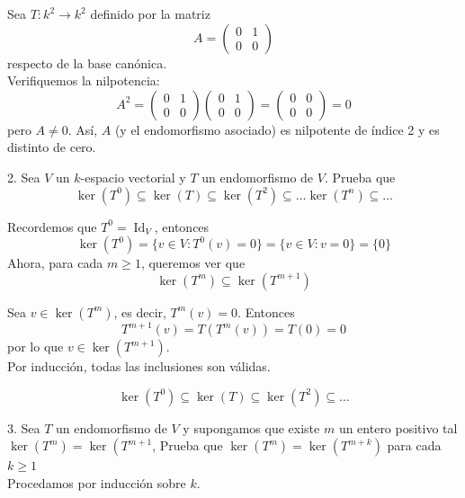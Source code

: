 \documentclass{article}
\theoremstyle{nonumberplain}
\begin{document}
Sea \( T: k^2 \to k^2 \) definido por la matriz
\[
A = \begin{pmatrix}
0 & 1 \\
0 & 0
\end{pmatrix}
\]
respecto de la base canónica. \\

Verifiquemos la nilpotencia:
\[
A^2 = \begin{pmatrix}
0 & 1 \\
0 & 0
\end{pmatrix}
\begin{pmatrix}
0 & 1 \\
0 & 0
\end{pmatrix}
=
\begin{pmatrix}
0 & 0 \\
0 & 0
\end{pmatrix} = 0
\]
pero \( A \neq 0 \). Así, \( A \) (y el endomorfismo asociado) es nilpotente de índice 2 y es distinto de cero.

2. Sea \( V \) un \( k \)-espacio vectorial y \( T \) un endomorfismo de \( V \). Prueba que
\[
\operatorname{ker}\left(T^{0}\right) \subseteq \operatorname{ker}(T) \subseteq \operatorname{ker}\left(T^{2}\right) \subseteq \ldots \operatorname{ker}\left(T^{n}\right) \subseteq \ldots
\]

Recordemos que \( T^0 = \operatorname{Id}_V \), entonces
\[
\operatorname{ker}(T^0) = \{v \in V : T^0(v) = 0\} = \{v \in V : v = 0\} = \{0\}
\]
Ahora, para cada \( m \geq 1 \), queremos ver que
\[
\operatorname{ker}(T^{m}) \subseteq \operatorname{ker}(T^{m+1})
\]

Sea \( v \in \operatorname{ker}(T^{m}) \), es decir, \( T^{m}(v) = 0 \). Entonces
\[
T^{m+1}(v) = T(T^{m}(v)) = T(0) = 0
\]
por lo que \( v \in \operatorname{ker}(T^{m+1}) \). \\

Por inducción, todas las inclusiones son válidas.

\[
\boxed{
\operatorname{ker}(T^{0}) \subseteq \operatorname{ker}(T) \subseteq \operatorname{ker}(T^{2}) \subseteq \ldots
}
\]

3. Sea \( T \) un endomorfismo de \( V \) y supongamos que existe \( m \) un entero positivo tal \( \operatorname{ker}\left(T^{m}\right)=\operatorname{ker}\left(T^{m+1}\right. \), Prueba que \( \operatorname{ker}\left(T^{m}\right)=\operatorname{ker}\left(T^{m+k}\right) \) para cada \( k \geq 1 \) \\

Procedamos por inducción sobre \( k \). \\
\end{document}
